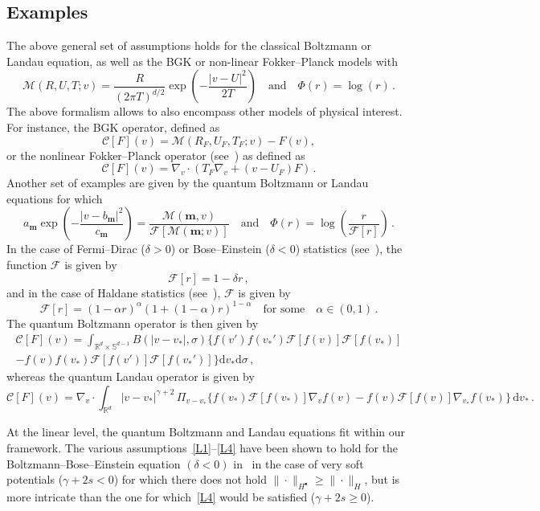 \documentclass[10pt]{amsart}
\theoremstyle{definition}\newtheorem{defi}[theo]{Definition}\newtheorem{rema}[theo]{Remark}\newtheorem{exam}[theo]{Example}\newtheorem{exem}[theo]{Example}\newtheorem{nota}[theo]{Notation}
\renewcommand{\d}{\mathrm{d}}
\newcommand{\R}{\mathbb{R}}
\renewcommand{\S}{\mathbb{S}}
\newcommand{\CC}{\mathcal{C}}
\newcommand{\FF}{\mathcal{F}}
\newcommand{\MM}{\mathcal{M}}
\newcommand{\Ss}{H}
\newcommand{\Ssp}{H^{\bullet}}
\renewcommand*\ge{\geqslant}
\begin{document}
\subsection*{Examples}

The above general set of assumptions holds for the classical Boltzmann or Landau equation, as well as the BGK or non-linear Fokker--Planck models with
\[
\MM(R, U, T ; v) = \frac{R}{ (2 \pi T)^{d/2} } \exp\left(- \frac{|v-U|^2}{2 T} \right) \quad \text{and} \quad \Phi(r) = \log(r) \,.
\]
The above formalism allows to also encompass other models of physical interest. For instance, the BGK operator, defined as
\[
\CC[F](v) = \MM(R_F, U_F, T_F ; v) -F(v),
\]
or the nonlinear Fokker--Planck operator (see~\cite[Section~1.6]{V2002}) as defined as
\[
\CC[F](v) = \nabla_v \cdot (T_F \nabla_v + (v - U_F) F) \,.
\]
Another set of examples are given by the quantum Boltzmann or Landau equations for which
\[
a_{\bm m} \exp\left(-\frac{|v-b_{\bm m} |^2}{c_{\bm m}} \right) = \frac{\MM({\bm m}, v)}{ \FF[\MM({\bm m} ; v)] } \quad \text{and} \quad \Phi(r) = \log\left(\frac{r}{\FF[r] } \right) \,.
\]
In the case of Fermi--Dirac ($\delta > 0$) or Bose--Einstein ($\delta < 0$) statistics (see~\cite{D1994, ABL}), the function $\FF$ is given by
\[
\FF[r] = 1 -\delta r \,,
\]
and in the case of Haldane statistics (see~\cite{AN2015}), $\FF$ is given by
\[
\FF[r] = (1-\alpha r)^{\alpha} \left(1 + (1-\alpha) r\right)^{1-\alpha} \quad \text{for some} \quad \alpha \in (0, 1) \,.
\]
The quantum Boltzmann operator is then given by
\begin{multline*}
\CC[F](v) = \int_{\R^{d}\times\S^{d-1}}B(|v-v_{*}|,\sigma) \Big\{ f(v')f(v_{*}') \FF[f(v)] \FF[f(v_*)] \\
-f(v)f(v_{*}) \FF[f(v')] \FF[f(v_*')] \Big\} \d v_{*}\d\sigma \,,
\end{multline*}
whereas the quantum Landau operator is given by
\[
\CC[F](v) =
\nabla_{v}\cdot \int_{\R^{d}} |v-v_{*}|^{\gamma+2} \, \Pi_{v-v_{*}}
\Big\{f(v_{*}) \FF[f(v_*)] \nabla_{v} f(v) - f(v) \FF[f(v)]{\nabla_{v_{*}} f}(v_{*}) \Big\}
\, \d v_{*} \,.
\]

At the linear level, the quantum Boltzmann and Landau equations fit within our framework. The various assumptions~\eqref{L1}--\eqref{L4} have been shown to hold for the Boltzmann--Bose--Einstein equation $(\delta < 0)$ in~\cite{YZ22, Z22} in the case of very soft potentials ($\gamma + 2 s < 0$) for which there does not hold $\| \cdot \|_{\Ssp} \ge \| \cdot \|_\Ss$, but is more intricate than the one for which~\eqref{L4} would be satisfied ($\gamma + 2 s \ge 0$).
\end{document}
